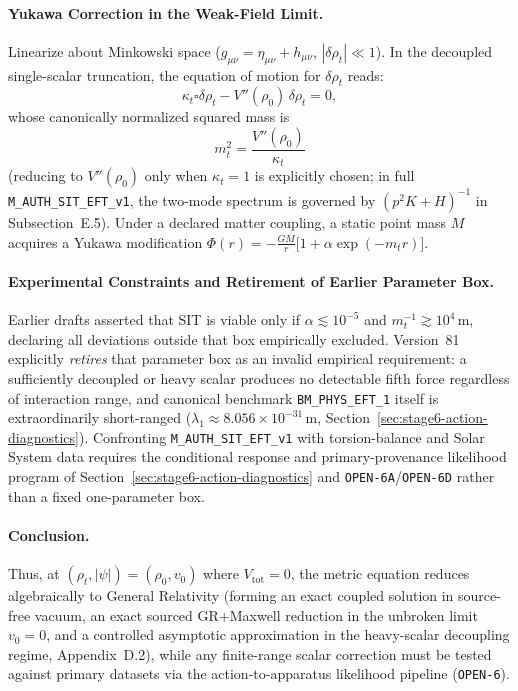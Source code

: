 \paragraph{Yukawa Correction in the Weak-Field Limit.}
Linearize about Minkowski space ($g_{\mu\nu} = \eta_{\mu\nu} + h_{\mu\nu}$, $|\delta \rho_t| \ll 1$). In the decoupled single-scalar truncation, the equation of motion for $\delta\rho_t$ reads:
\[
\kappa_t \square \delta\rho_t - V''(\rho_0)\, \delta\rho_t = 0,
\]
whose canonically normalized squared mass is
\[
m_t^2 = \frac{V''(\rho_0)}{\kappa_t}
\]
(reducing to $V''(\rho_0)$ only when $\kappa_t = 1$ is explicitly chosen; in full \texttt{M\_AUTH\_SIT\_EFT\_v1}, the two-mode spectrum is governed by $(p^2 K + H)^{-1}$ in Subsection~E.5). Under a declared matter coupling, a static point mass $M$ acquires a Yukawa modification $\Phi(r) = -\frac{GM}{r}\bigl[1 + \alpha \exp(-m_t r)\bigr]$.

\paragraph{Experimental Constraints and Retirement of Earlier Parameter Box.}
Earlier drafts asserted that SIT is viable only if $\alpha \lesssim 10^{-5}$ and $m_t^{-1} \gtrsim 10^4\,\mathrm{m}$, declaring all deviations outside that box empirically excluded. Version~81 explicitly \emph{retires} that parameter box as an invalid empirical requirement: a sufficiently decoupled or heavy scalar produces no detectable fifth force regardless of interaction range, and canonical benchmark \texttt{BM\_PHYS\_EFT\_1} itself is extraordinarily short-ranged ($\lambda_1 \approx 8.056\times 10^{-31}\,\mathrm{m}$, Section~\ref{sec:stage6-action-diagnostics}). Confronting \texttt{M\_AUTH\_SIT\_EFT\_v1} with torsion-balance and Solar System data requires the conditional response and primary-provenance likelihood program of Section~\ref{sec:stage6-action-diagnostics} and \texttt{OPEN-6A}/\texttt{OPEN-6D} rather than a fixed one-parameter box.

\paragraph{Conclusion.}
Thus, at $(\rho_t, |\psi|) = (\rho_0, v_0)$ where $V_{\mathrm{tot}} = 0$, the metric equation reduces algebraically to General Relativity (forming an exact coupled solution in source-free vacuum, an exact sourced GR+Maxwell reduction in the unbroken limit $v_0 = 0$, and a controlled asymptotic approximation in the heavy-scalar decoupling regime, Appendix~D.2), while any finite-range scalar correction must be tested against primary datasets via the action-to-apparatus likelihood pipeline (\texttt{OPEN-6}).

